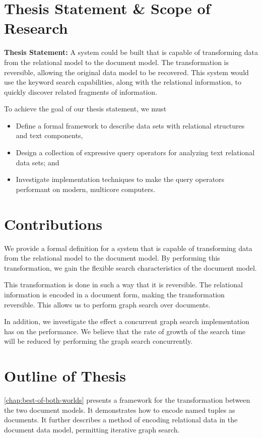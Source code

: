 	\section{Thesis Statement \& Scope of Research}
		\begin{displayquote}
			\textbf{Thesis Statement:}  A system could be built that is capable of transforming data from the relational model to the document model.  The transformation is reversible, allowing the original data model to be recovered.  This system would use the keyword search capabilities, along with the relational information, to quickly discover related fragments of information.
		\end{displayquote}
		
		To achieve the goal of our thesis statement, we must
		
		\begin{itemize}
			\item Define a formal framework to describe data sets with relational structures and text components,
			\item Design a collection of expressive query operators for analyzing text relational data sets; and
			\item Investigate implementation techniques to make the query operators performant on modern, multicore computers.
		\end{itemize}
		
	 \section{Contributions}
	 	We provide a formal definition for a system that is capable of transforming data from the relational model to the document model.  By performing this transformation, we gain the flexible search characteristics of the document model.
	 	
	 	This transformation is done in such a way that it is reversible.  The relational information is encoded in a document form, making the transformation reversible.  This allows us to perform graph search over documents.
	 	
	 	In addition, we investigate the effect a concurrent graph search implementation has on the performance.  We believe that the rate of growth of the search time will be reduced by performing the graph search concurrently.
	
	\section{Outline of Thesis}
		\cref{chap:best-of-both-worlds} presents a framework for the transformation between the two document models.  It demonstrates how to encode named tuples as documents.  It further describes a method of encoding relational data in the document data model, permitting iterative graph search.
		
